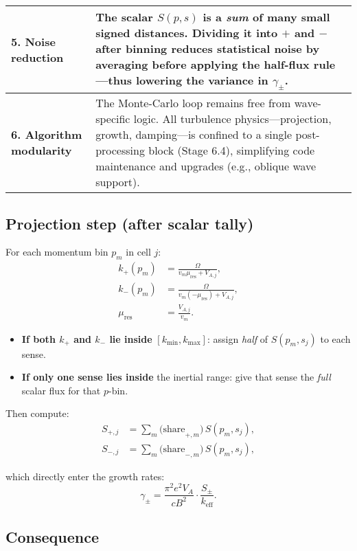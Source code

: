 {\begin{table}[h!]
\begin{tabular}{|p{3.5cm}|p{11.5cm}|}
\textbf{5. Noise reduction} &
The scalar $S(p, s)$ is a \emph{sum} of many small signed distances. Dividing it into $+$ and $-$ after binning reduces statistical noise by averaging before applying the half-flux rule—thus lowering the variance in $\gamma_\pm$. \\
\hline

\textbf{6. Algorithm modularity} &
The Monte-Carlo loop remains free from wave-specific logic. All turbulence physics—projection, growth, damping—is confined to a single post-processing block (Stage 6.4), simplifying code maintenance and upgrades (e.g., oblique wave support). \\
\hline
\end{tabular}
\end{table}

\subsection*{Projection step (after scalar tally)}

For each momentum bin $p_m$ in cell $j$:
\[
\begin{aligned}
k_{+}(p_m) &= \frac{\Omega}{v_m \mu_{\mathrm{res}} + V_{A,j}}, \\
k_{-}(p_m) &= \frac{\Omega}{v_m (-\mu_{\mathrm{res}}) + V_{A,j}}, \\[6pt]
\mu_{\mathrm{res}} &= \frac{V_{A,j}}{v_m}.
\end{aligned}
\]

\begin{itemize}
  \item \textbf{If both $k_{+}$ and $k_{-}$ lie inside} $[k_{\min}, k_{\max}]$:
        assign \emph{half} of $S(p_m, s_j)$ to each sense.
  \item \textbf{If only one sense lies inside} the inertial range:
        give that sense the \emph{full} scalar flux for that $p$-bin.
\end{itemize}

Then compute:
\[
\begin{aligned}
S_{+,j} &= \sum_m \text{(share}_{+,m})\,S(p_m, s_j), \\
S_{-,j} &= \sum_m \text{(share}_{-,m})\,S(p_m, s_j),
\end{aligned}
\]

which directly enter the growth rates:
\[
\gamma_\pm = \frac{\pi^2 e^2 V_A}{c B^2} \cdot \frac{S_\pm}{k_{\mathrm{eff}}}.
\]

\subsection*{Consequence}

}
